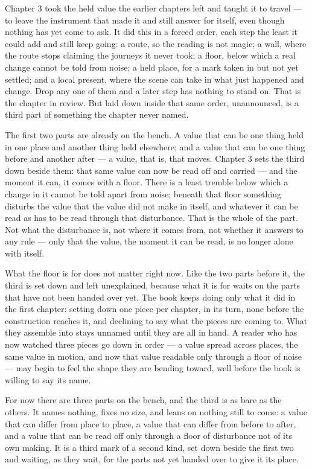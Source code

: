 Chapter 3 took the held value the earlier chapters left and taught it to travel --- to leave the instrument that made it and still answer for itself, even though nothing has yet come to ask. It did this in a forced order, each step the least it could add and still keep going: a route, so the reading is not magic; a wall, where the route stops claiming the journeys it never took; a floor, below which a real change cannot be told from noise; a held place, for a mark taken in but not yet settled; and a local present, where the scene can take in what just happened and change. Drop any one of them and a later step has nothing to stand on. That is the chapter in review. But laid down inside that same order, unannounced, is a third part of something the chapter never named.

The first two parts are already on the bench. A value that can be one thing held in one place and another thing held elsewhere; and a value that can be one thing before and another after --- a value, that is, that moves. Chapter 3 sets the third down beside them: that same value can now be read off and carried --- and the moment it can, it comes with a floor. There is a least tremble below which a change in it cannot be told apart from noise; beneath that floor something disturbs the value that the value did not make in itself, and whatever it can be read as has to be read through that disturbance. That is the whole of the part. Not what the disturbance is, not where it comes from, not whether it answers to any rule --- only that the value, the moment it can be read, is no longer alone with itself.

What the floor is for does not matter right now. Like the two parts before it, the third is set down and left unexplained, because what it is for waits on the parts that have not been handed over yet. The book keeps doing only what it did in the first chapter: setting down one piece per chapter, in its turn, none before the construction reaches it, and declining to say what the pieces are coming to. What they assemble into stays unnamed until they are all in hand. A reader who has now watched three pieces go down in order --- a value spread across places, the same value in motion, and now that value readable only through a floor of noise --- may begin to feel the shape they are bending toward, well before the book is willing to say its name.

For now there are three parts on the bench, and the third is as bare as the others. It names nothing, fixes no size, and leans on nothing still to come: a value that can differ from place to place, a value that can differ from before to after, and a value that can be read off only through a floor of disturbance not of its own making. It is a third mark of a second kind, set down beside the first two and waiting, as they wait, for the parts not yet handed over to give it its place.
